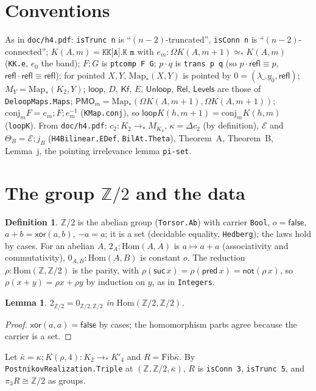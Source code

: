 \documentclass[11pt]{amsart}
\newtheorem{lemma}[theorem]{Lemma}
\theoremstyle{definition}
\newtheorem{definition}[theorem]{Definition}
\theoremstyle{remark}
\newcommand{\Om}{\Omega}
\newcommand{\Map}{\mathrm{Map}_*}
\newcommand{\Z}{\mathbb{Z}}
\newcommand{\code}[1]{\texttt{#1}}
\newcommand{\refl}{\mathsf{refl}}
\newcommand{\lp}{\mathsf{loop}}
\newcommand{\Kf}{\mathsf{Kf}}
\newcommand{\Hom}{\mathrm{Hom}}
\newcommand{\Unl}{\mathsf{Unloop}}
\newcommand{\PMO}{\mathsf{PMO}}
\newcommand{\Fib}{\mathrm{Fib}}
\newcommand{\kb}{\bar\kappa}
\newcommand{\cE}{\mathcal E}
\begin{document}
\section{Conventions}

As in \code{doc/h4.pdf}: \code{isTrunc n} is ``$(n-2)$-truncated'',
\code{isConn n} is ``$(n-2)$-connected''; $K(A,m)=\code{KK[A].K m}$ with
$e_m:\Om K(A,m{+}1)\simeq_*K(A,m)$ (\code{KK.e}, $e_0$ the band); $F;G$ is
\code{ptcomp F G}; $p\cdot q$ is \code{trans p q} (so
$p\cdot\refl\equiv p$, $\refl\cdot\refl\equiv\refl$); for pointed $X,Y$,
$\Map(X,Y)$ is pointed by $0=(\lambda\_.y_0,\refl)$; $M_Y=\Map(K_2,Y)$;
$\lp$, $D$, $\Kf$, $E$, $\Unl$, $\mathsf{Rel}$, $\mathsf{Levels}$ are those of
\code{DeloopMaps.Maps}; $\PMO_m=\Map(\Om K(A,m{+}1),\Om K(A,m{+}1))$;
$\mathrm{conj}_m F=e_m;F;e_m^{-1}$ (\code{KMap.conj}), so
$\lp K(h,m{+}1)=\mathrm{conj}_m K(h,m)$ (\code{loopK}). From
\code{doc/h4.pdf}: $c_2:K_2\to_*M_{K_4}$, $\kappa=\Delta c_2$ (by
definition), $\cE$ and $\Theta_B=\cE;j_B$ (\code{H4Bilinear.EDef},
\code{BilAt.Theta}), Theorem~A, Theorem~B, Lemma~j, the pointing
irrelevance lemma \code{pi-set}.

\section{The group $\Z/2$ and the data}

\begin{definition}\label{d:z2}
$\Z/2$ is the abelian group (\code{Torsor.Ab}) with carrier \code{Bool},
$o=\mathsf{false}$, $a+b=\mathsf{xor}(a,b)$, $-a=a$; it is a set
(decidable equality, \code{Hedberg}); the laws hold by cases. For an
abelian $A$, $2_A:\Hom(A,A)$ is $a\mapsto a+a$ (associativity and
commutativity), $0_{A,B}:\Hom(A,B)$ is constant $o$. The reduction
$\rho:\Hom(\Z,\Z/2)$ is the parity, with $\rho(\mathsf{suc}\,x)=\rho(\mathsf{pred}\,x)=\mathsf{not}(\rho\,x)$,
so $\rho(x+y)=\rho x+\rho y$ by induction on $y$, as in \code{Integers}.
\end{definition}

\begin{lemma}\label{l:two}
$2_{\Z/2}=0_{\Z/2,\Z/2}$ in $\Hom(\Z/2,\Z/2)$.
\end{lemma}
\begin{proof}
$\mathsf{xor}(a,a)=\mathsf{false}$ by cases; the homomorphism parts agree
because the carrier is a set.
\end{proof}

\noindent Let $\kb=\kappa;K(\rho,4):K_2\to_*K'_4$ and $R=\Fib\kb$.
By \code{PostnikovRealization.Triple} at $(\Z,\Z/2,\kb)$, $R$ is
\code{isConn 3}, \code{isTrunc 5}, and $\pi_3R\cong\Z/2$ as groups.
\end{document}

